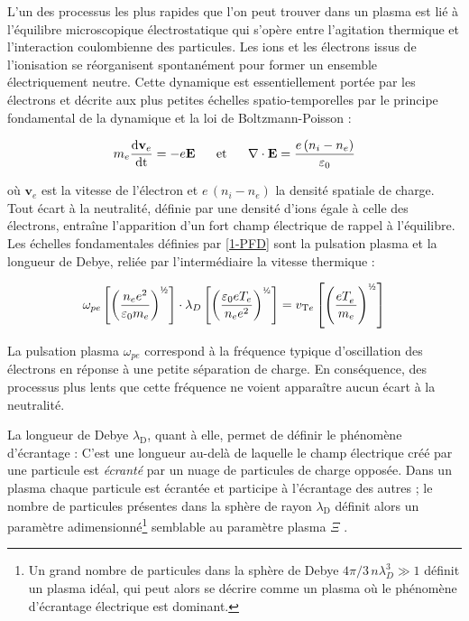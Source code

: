 \begin{refsection}
L'un des processus les plus rapides que l'on peut trouver dans un plasma est lié à
l'équilibre microscopique électrostatique qui s'opère
entre l'agitation thermique et l'interaction coulombienne des particules. Les
ions et les électrons issus de l'ionisation se réorganisent spontanément pour former un ensemble électriquement neutre.
Cette dynamique est essentiellement portée par les électrons et décrite aux plus petites
échelles spatio-temporelles par le principe fondamental de la dynamique et la loi
de Boltzmann-Poisson :

\begin{align}
\label{1-PFD}
m_{e}\frac{\text{d} \mathbf{v}_{e}}{\text{dt}}=-e\mathbf E
\;\;\;\;\;\;\text{et}\;\;\;\;\;\;
\nabla\cdot\mathbf{E}=\frac{e\,(n_{i}-n_{e})}{\varepsilon{_{0}}}
\end{align}

où $\mathbf{v}_{e}$ est la vitesse de l'électron et
$e\,(n_{i}-n_{e})$ la densité spatiale de charge.
Tout écart à la neutralité, définie par une densité d'ions égale à celle des
électrons, entraîne l'apparition d'un fort champ électrique de rappel à
l'équilibre.
Les échelles fondamentales définies par \eqref{1-PFD} sont la pulsation
plasma et la longueur de Debye, reliée par l'intermédiaire la vitesse thermique :

\begin{equation}
\omega_{pe}\left[\left(\frac{n_e
e\puissance{2}}{\varepsilon\indice{0} m_{e}}\right)^{\text{\textonehalf}}
\right]\cdot\lambda_D\left[\left(\frac{\varepsilon\indice{0}
eT_{e}}{n_e e\puissance{2}}\right)^{\text{\textonehalf}}\right]
=v_{\text{T}{e}}\left[\left(\frac{eT_{e}^{^{\phantom{1}}}}{m_{e}}\right)^{\text{\textonehalf}}\right]
\end{equation}

La pulsation plasma $\omega_{pe}$ correspond à la fréquence typique
d'oscillation des électrons en réponse à une petite séparation de charge. En
conséquence, des processus plus lents que cette fréquence ne voient
apparaître aucun écart à la neutralité.

La longueur de Debye $\lambda_\text{D}$, quant à elle, permet de définir le
phénomène d'écrantage :
C'est une longueur au-delà de laquelle le champ électrique créé par une particule est \emph{écranté} par 
un nuage de particules de charge opposée. Dans un plasma chaque particule est écrantée et participe
à l'écrantage des autres ; le nombre de particules présentes
dans la sphère de rayon $\lambda_\text{D}$ définit alors un paramètre
adimensionné\footnote{Un
grand nombre de particules dans la sphère de Debye $4\pi/3\,n\lambda_D^3\gg1$
définit un plasma idéal, qui peut alors se décrire comme un plasma où le
phénomène d'écrantage électrique est dominant.} semblable au paramètre plasma $\Xi$ .


\end{refsection}
